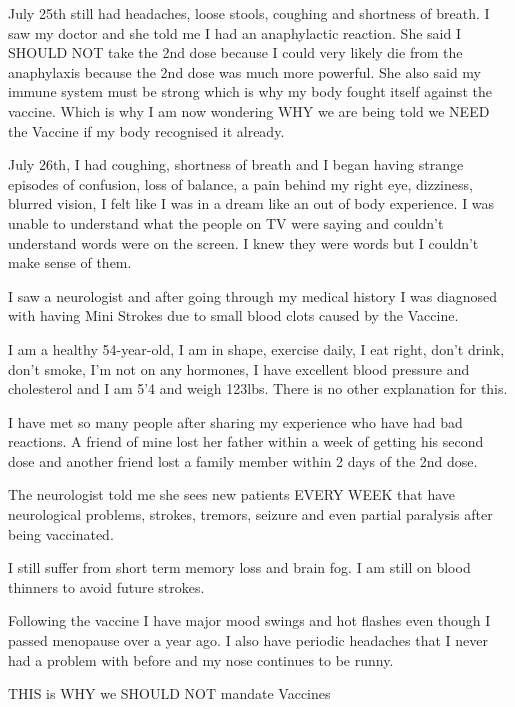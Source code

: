 July 25th still had headaches, loose stools, coughing and shortness of breath. I
saw my doctor and she told me I had an anaphylactic reaction. She said I SHOULD
NOT take the 2nd dose because I could very likely die from the anaphylaxis
because the 2nd dose was much more powerful. She also said my immune system must
be strong which is why my body fought itself against the vaccine. Which is why I
am now wondering WHY we are being told we NEED the Vaccine if my body recognised
it already.

July 26th, I had coughing, shortness of breath and I began having strange
episodes of confusion, loss of balance, a pain behind my right eye, dizziness,
blurred vision, I felt like I was in a dream like an out of body experience. I
was unable to understand what the people on TV were saying and couldn’t
understand words were on the screen. I knew they were words but I couldn’t make
sense of them.

I saw a neurologist and after going through my medical history I was diagnosed
with having Mini Strokes due to small blood clots caused by the Vaccine.

I am a healthy 54-year-old, I am in shape, exercise daily, I eat right, don’t
drink, don’t smoke, I’m not on any hormones, I have excellent blood pressure and
cholesterol and I am 5’4 and weigh 123lbs. There is no other explanation for
this.

I have met so many people after sharing my experience who have had bad
reactions. A friend of mine lost her father within a week of getting his second
dose and another friend lost a family member within 2 days of the 2nd dose.

The neurologist told me she sees new patients EVERY WEEK that have neurological
problems, strokes, tremors, seizure and even partial paralysis after being
vaccinated.

I still suffer from short term memory loss and brain fog. I am still on blood
thinners to avoid future strokes.

Following the vaccine I have major mood swings and hot flashes even though I
passed menopause over a year ago. I also have periodic headaches that I never
had a problem with before and my nose continues to be runny.

THIS is WHY we SHOULD NOT mandate Vaccines


